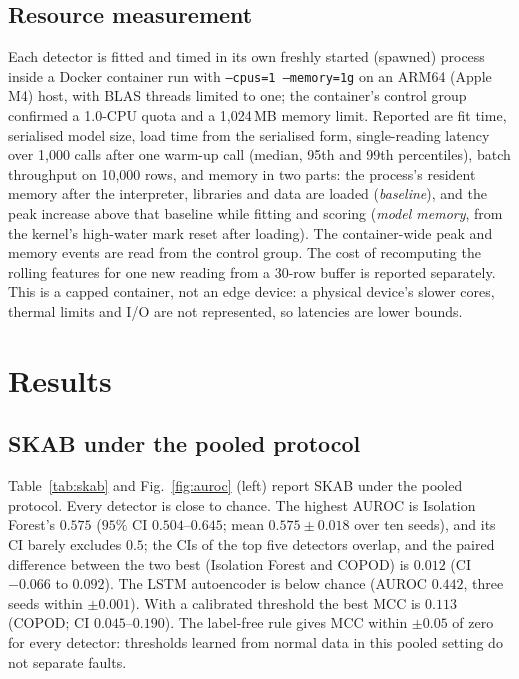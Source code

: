 \documentclass[11pt]{article}
\begin{document}
\subsection{Resource measurement}
Each detector is fitted and timed in its own freshly started (spawned) process
inside a Docker container run with \texttt{--cpus=1 --memory=1g} on an ARM64
(Apple M4) host, with BLAS threads limited to one; the container's control group
confirmed a 1.0-CPU quota and a 1{,}024\,MB memory limit. Reported are fit time,
serialised model size, load time from the serialised form, single-reading latency
over 1{,}000 calls after one warm-up call (median, 95th and 99th percentiles), batch
throughput on 10{,}000 rows, and memory in two parts: the process's resident memory
after the interpreter, libraries and data are loaded (\emph{baseline}), and the peak
increase above that baseline while fitting and scoring (\emph{model memory}, from
the kernel's high-water mark reset after loading). The container-wide peak and
memory events are read from the control group.
The cost of recomputing the rolling features for one new reading from a
30-row buffer is reported separately. This is a capped container, not an edge
device: a physical device's slower cores, thermal limits and I/O are not
represented, so latencies are lower bounds.

\section{Results}
\label{sec:results}

\subsection{SKAB under the pooled protocol}
Table~\ref{tab:skab} and Fig.~\ref{fig:auroc} (left) report SKAB under the pooled
protocol. Every detector is close to chance. The highest AUROC is Isolation
Forest's $0.575$ ($95\%$ CI $0.504$--$0.645$; mean $0.575\pm0.018$ over ten seeds),
and its CI barely excludes $0.5$; the CIs of the top five detectors overlap, and
the paired difference between the two best (Isolation Forest and COPOD) is
$0.012$ (CI $-0.066$ to $0.092$). The LSTM autoencoder is below chance
(AUROC $0.442$, three seeds within $\pm0.001$). With a calibrated threshold the
best MCC is $0.113$ (COPOD; CI $0.045$--$0.190$). The label-free rule gives MCC
within $\pm0.05$ of zero for every detector: thresholds learned from normal
data in this pooled setting do not separate faults.
\end{document}
